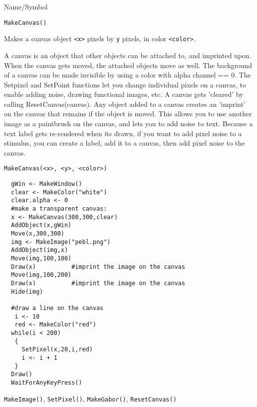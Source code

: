\begin{desc}{Name/Symbol}
\item[Name/Symbol]	\verb+MakeCanvas()+

\item[Description] Makes a canvas object  \verb+<x>+ pixels by
  \verb+y+ pixels, in color \verb+<color>+.

A canvas is an object that other objects can be attached to, and imprinted upon.
When the canvas gets moved, the attached objects move as well. The background of a canvas can be
made invisible by using a color with alpha channel == 0. The Setpixel
and SetPoint functions let you change individual pixels on a canvas,
to enable adding noise, drawing functional images, etc. A canvas gets
'cleared' by calling ResetCanvas(canvas). Any object added to a canvas creates an 'imprint' on the canvas that
remains if the object is moved.  This allows you to use another image
as a paintbrush on the canvas, and lets you to add noise to text.
Because a text label gets re-rendered when its drawn, if you want to
add pixel noise to a stimulus, you can create a label, add it to a
canvas, then add pixel noise to the canvas.

\item[Usage]
\begin{verbatim}
MakeCanvas(<x>, <y>, <color>)
\end{verbatim}

\item[Example]	
\begin{verbatim}
  gWin <- MakeWindow()
  clear <- MakeColor("white")
  clear.alpha <- 0
  #make a transparent canvas:
  x <- MakeCanvas(300,300,clear)  
  AddObject(x,gWin)
  Move(x,300,300)
  img <- MakeImage("pebl.png")
  AddObject(img,x)
  Move(img,100,100)
  Draw(x)          #imprint the image on the canvas
  Move(img,100,200)
  Draw(x)          #imprint the image on the canvas
  Hide(img)

  #draw a line on the canvas
   i <- 10
   red <- MakeColor("red")
  while(i < 200)
   {
     SetPixel(x,20,i,red)
     i <- i + 1
   }
  Draw()
  WaitForAnyKeyPress()
\end{verbatim}
\item[See Also]	\verb+MakeImage()+, \verb+SetPixel()+,
  \verb+MakeGabor()+, \verb+ResetCanvas()+
\end{desc}

